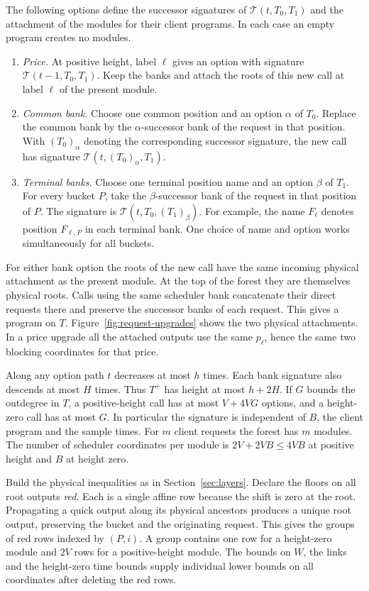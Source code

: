The following options define the successor signatures of \(\mathcal T(t,T_0,T_1)\)
and the attachment of the modules for their client programs. In each case an empty
program creates no modules.
\begin{enumerate}
\item \emph{Price.} At positive height, label \(\ell\) gives an option with signature
\(\mathcal T(t-1,T_0,T_1)\). Keep the banks and attach the roots of this new call at
label \(\ell\) of the present module.
\item \emph{Common bank.} Choose one common position and an option \(\alpha\) of
\(T_0\). Replace the common bank by the \(\alpha\)-successor bank of the request in
that position. With \((T_0)_\alpha\) denoting the corresponding successor signature,
the new call has signature \(\mathcal T(t,(T_0)_\alpha,T_1)\).
\item \emph{Terminal banks.} Choose one terminal position name and an option \(\beta\)
of \(T_1\). For every bucket \(P\), take the \(\beta\)-successor bank of the request
in that position of \(P\). The signature is \(\mathcal T(t,T_0,(T_1)_\beta)\).
For example, the name \(F_\ell\) denotes position \(F_{\ell,P}\) in each terminal
bank. One choice of name and option works simultaneously for all buckets.
\end{enumerate}
For either bank option the roots of the new call have the same incoming physical
attachment as the present module. At the top of the forest they are themselves
physical roots. Calls using the same scheduler bank concatenate their direct requests
there and preserve the successor banks of each request. This gives a program on \(T\).
Figure~\ref{fig:request-upgrades} shows the two physical attachments. In a price
upgrade all the attached outputs use the same \(p_\ell\), hence the same two blocking
coordinates for that price.



Along any option path \(t\) decreases at most \(h\) times. Each bank signature also
descends at most \(H\) times. Thus \(T^+\) has height at most \(h+2H\). If \(G\)
bounds the outdegree in \(T\), a positive-height call has at most \(V+4VG\) options,
and a height-zero call has at most \(G\). In particular the signature is independent
of \(B\), the client program and the sample times. For \(m\) client requests the
forest has \(m\) modules. The number of scheduler coordinates per module is
\(2V+2VB\le4VB\) at positive height and \(B\) at height zero.

Build the physical inequalities as in Section~\ref{sec:layers}. Declare the floors
on all root outputs \emph{red}. Each is a single affine row because the shift is zero
at the root. Propagating a quick output along its physical ancestors produces a
unique root output, preserving the bucket and the originating request. This gives
the groups of red rows indexed by \((P,i)\). A group contains one row for a height-zero
module and \(2V\) rows for a positive-height module. The bounds on \(W\), the links
and the height-zero time bounds supply individual lower bounds on all coordinates
after deleting the red rows.

